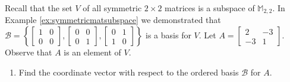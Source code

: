 \documentclass{ximera}
\begin{document}
\begin{example}\label{ex:symmmatsubspace}
Recall that the set $V$ of all symmetric $2\times 2$ matrices is a subspace of $\mathbb{M}_{2,2}$.  In Example \ref{ex:symmetricmatsubspace} we demonstrated that $\mathcal{B} = \left\{
\begin{bmatrix}
1 & 0 \\
0 & 0
\end{bmatrix}, \begin{bmatrix}
0 & 0 \\
0 & 1
\end{bmatrix}, \begin{bmatrix}
0 & 1 \\
1 & 0
\end{bmatrix}
\right\}$ is a basis for $V$.  
Let $A=\begin{bmatrix}2&-3\\-3&1\end{bmatrix}$.  Observe that $A$ is an element of $V$.
\begin{enumerate}
\item
Find the coordinate vector with respect to the ordered basis $\mathcal{B}$ for $A$.


\end{enumerate}
\end{example}
\end{document}
